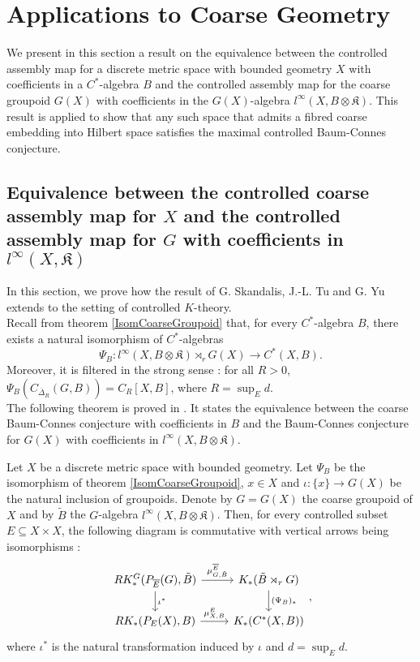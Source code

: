 \section{Applications to Coarse Geometry}

We present in this section a result on the equivalence between the controlled assembly map for a discrete metric space with bounded geometry $X$ with coefficients in a $C^*$-algebra $B$ and the controlled assembly map for the coarse groupoid $G(X)$ with coefficients in the $G(X)$-algebra $l^\infty(X,B\otimes \mathfrak K)$. This result is applied to show that any such space that admits a fibred coarse embedding into Hilbert space satisfies the maximal controlled Baum-Connes conjecture.

\subsection{Equivalence between the controlled coarse assembly map for $X$ and the controlled assembly map for $G$ with coefficients in $l^\infty(X,\mathfrak K)$}

In this section, we prove how the result of G. Skandalis, J.-L. Tu and G. Yu \cite{SkTuYu} extends to the setting of controlled $K$-theory. \\

Recall from theorem \ref{IsomCoarseGroupoid} that, for every $C^*$-algebra $B$, there exists a natural isomorphism of $C^*$-algebras 
\[\Psi_B : l^\infty(X,B\otimes\mathfrak K)\rtimes_r G(X)\rightarrow C^*(X,B).\]
Moreover, it is filtered in the strong sense : for all $R>0$, $\Psi_B(C_{\overline\Delta_R}(G,B))= C_R[X,B]$, where $R=\sup_E d$.\\

The following theorem is proved in \cite{SkTuYu}. It states the equivalence between the coarse Baum-Connes conjecture with coefficients in $B$ and the Baum-Connes conjecture for $G(X)$ with coefficients in $l^\infty(X,B\otimes\mathfrak K)$.  

\begin{thm}
Let $X$ be a discrete metric space with bounded geometry. Let $\Psi_B$ be the isomorphism of theorem \ref{IsomCoarseGroupoid}, $x\in X$ and $\iota :\{x\}\rightarrow G(X)$ be the natural inclusion of groupoids. Denote by $G=G(X)$ the coarse groupoid of $X$ and by $\tilde B$ the $G$-algebra $l^\infty (X,B\otimes\mathfrak K)$. Then, for every controlled subset $E\subseteq X\times X$, the following diagram is commutative with vertical arrows being isomorphisms :
\[\begin{tikzcd}
RK_*^G(P_{\overline{E}}(G),\tilde B) \arrow{r}{\mu_{G,\tilde B}^{\overline E}}\arrow{d}{\iota^*}& K_*(\tilde B\rtimes_r G)\arrow{d}{(\Psi_B)_*}\\
RK_*(P_E(X),B) \arrow{r}{\mu_{X,B}^E}& K_*(C^*(X,B))
\end{tikzcd},\]
where $\iota^*$ is the natural transformation induced by $\iota$ and $d= \sup_E d$.
\end{thm}

